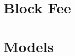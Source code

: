 \documentclass[USenglish]{uit-thesis}
\begin{document}
\section{Block Fee}
\label{sec:block-fee}

\section{Models}
\label{sec:models}

\end{document}
